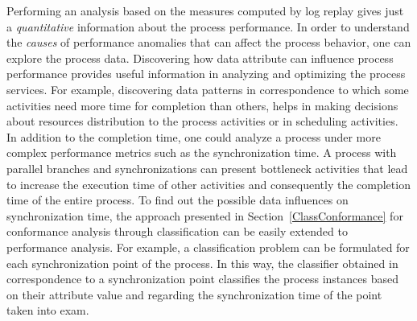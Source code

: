 \documentclass{llncs}
\begin{document}
{Performing an analysis based on the measures computed by log replay gives just a \emph{quantitative} information about the process performance. In order to understand the \emph{causes} of performance anomalies that can affect the process behavior, one can explore the process data. Discovering how data attribute can influence process performance provides useful information in analyzing and optimizing the process services. For example, discovering data patterns in correspondence to which some activities need more time for completion than others, helps in making decisions about resources distribution to the process activities or in scheduling activities. In addition to the completion time, one could analyze a process under more complex performance metrics such as the synchronization time. A process with parallel branches and synchronizations can present bottleneck activities that lead to increase the execution time of other activities and consequently the completion time of the entire process. To find out the possible data influences on synchronization time, the approach presented in Section~\ref{ClassConformance} for conformance analysis through classification can be easily extended to performance analysis. For example, a classification problem can be formulated for each synchronization point of the process. In this way, the classifier obtained in correspondence to a synchronization point classifies the process instances based on their attribute value and regarding the synchronization time of the point taken into exam. 

}
\end{document}
